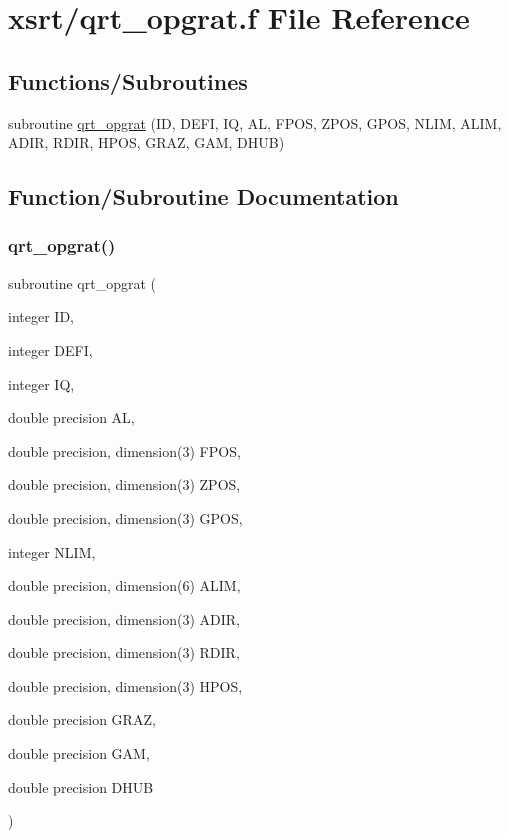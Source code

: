 \hypertarget{qrt__opgrat_8f}{}\section{xsrt/qrt\+\_\+opgrat.f File Reference}
\label{qrt__opgrat_8f}
\subsection*{Functions/\+Subroutines}
\begin{DoxyCompactItemize}
\item 
subroutine \hyperlink{qrt__opgrat_8f_a6a13564cbf9ceb04a20a66c9762ca16e}{qrt\+\_\+opgrat} (ID, D\+E\+FI, IQ, AL, F\+P\+OS, Z\+P\+OS, G\+P\+OS, N\+L\+IM, A\+L\+IM, A\+D\+IR, R\+D\+IR, H\+P\+OS, G\+R\+AZ, G\+AM, D\+H\+UB)
\end{DoxyCompactItemize}


\subsection{Function/\+Subroutine Documentation}
\mbox{\label{qrt__opgrat_8f_a6a13564cbf9ceb04a20a66c9762ca16e}} 
\subsubsection{\texorpdfstring{qrt\+\_\+opgrat()}{qrt\_opgrat()}}
{\footnotesize\ttfamily subroutine qrt\+\_\+opgrat (\begin{DoxyParamCaption}\item[{integer}]{ID,  }\item[{integer}]{D\+E\+FI,  }\item[{integer}]{IQ,  }\item[{double precision}]{AL,  }\item[{double precision, dimension(3)}]{F\+P\+OS,  }\item[{double precision, dimension(3)}]{Z\+P\+OS,  }\item[{double precision, dimension(3)}]{G\+P\+OS,  }\item[{integer}]{N\+L\+IM,  }\item[{double precision, dimension(6)}]{A\+L\+IM,  }\item[{double precision, dimension(3)}]{A\+D\+IR,  }\item[{double precision, dimension(3)}]{R\+D\+IR,  }\item[{double precision, dimension(3)}]{H\+P\+OS,  }\item[{double precision}]{G\+R\+AZ,  }\item[{double precision}]{G\+AM,  }\item[{double precision}]{D\+H\+UB }\end{DoxyParamCaption})}

